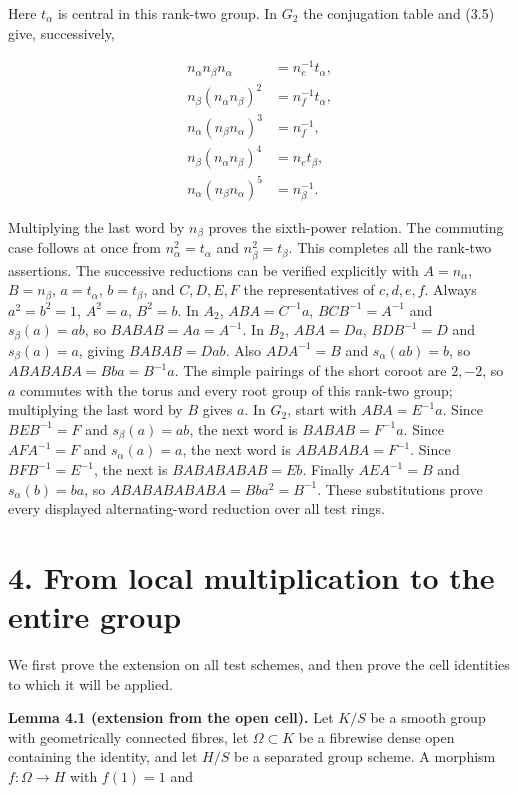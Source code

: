 \documentclass[11pt,a4paper,openany]{report}
\begin{document}
Here \(t_\alpha\) is central in this rank-two group. In \(G_2\) the conjugation table and (3.5) give, successively,

\[
\begin{aligned}
n_\alpha n_\beta n_\alpha&=n_e^{-1}t_\alpha,\\
n_\beta(n_\alpha n_\beta)^2&=n_f^{-1}t_\alpha,\\
n_\alpha(n_\beta n_\alpha)^3&=n_f^{-1},\\
n_\beta(n_\alpha n_\beta)^4&=n_et_\beta,\\
n_\alpha(n_\beta n_\alpha)^5&=n_\beta^{-1}.
\end{aligned}
\]

Multiplying the last word by \(n_\beta\) proves the sixth-power relation. The commuting case follows at once from \(n_\alpha^2=t_\alpha\) and \(n_\beta^2=t_\beta\). This completes all the rank-two assertions. The successive reductions can be verified explicitly with \(A=n_\alpha\), \(B=n_\beta\), \(a=t_\alpha\), \(b=t_\beta\), and \(C,D,E,F\) the representatives of \(c,d,e,f\). Always \(a^2=b^2=1\), \(A^2=a\), \(B^2=b\). In \(A_2\), \(ABA=C^{-1}a\), \(BCB^{-1}=A^{-1}\) and \(s_\beta(a)=ab\), so \(BABAB=Aa=A^{-1}\). In \(B_2\), \(ABA=Da\), \(BDB^{-1}=D\) and \(s_\beta(a)=a\), giving \(BABAB=Dab\). Also \(ADA^{-1}=B\) and \(s_\alpha(ab)=b\), so \(ABABABA=Bba=B^{-1}a\). The simple pairings of the short coroot are \(2,-2\), so \(a\) commutes with the torus and every root group of this rank-two group; multiplying the last word by \(B\) gives \(a\). In \(G_2\), start with \(ABA=E^{-1}a\). Since \(BEB^{-1}=F\) and \(s_\beta(a)=ab\), the next word is \(BABAB=F^{-1}a\). Since \(AFA^{-1}=F\) and \(s_\alpha(a)=a\), the next word is \(ABABABA=F^{-1}\). Since \(BFB^{-1}=E^{-1}\), the next is \(BABABABAB=Eb\). Finally \(AEA^{-1}=B\) and \(s_\alpha(b)=ba\), so \(ABABABABABA=Bba^2=B^{-1}\). These substitutions prove every displayed alternating-word reduction over all test rings.

\section{4. From local multiplication to the entire group}\label{AG-RG-05-from-local-multiplication-to-the-entire-group}

We first prove the extension on all test schemes, and then prove the cell identities to which it will be applied.

\textbf{Lemma 4.1 (extension from the open cell).} Let \(K/S\) be a smooth group with geometrically connected fibres, let \(\Omega\subset K\) be a fibrewise dense open containing the identity, and let \(H/S\) be a separated group scheme. A morphism \(f:\Omega\to H\) with \(f(1)=1\) and
\end{document}
